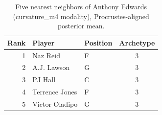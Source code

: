 \begin{table}[htbp]
  \centering\small
  \begin{tabular}{rllc}
    \toprule
    Rank & Player & Position & Archetype \\
    \midrule
    1 & Naz Reid & F & 3 \\
    2 & A.J. Lawson & G & 3 \\
    3 & PJ Hall & C & 3 \\
    4 & Terrence Jones & F & 3 \\
    5 & Victor Oladipo & G & 3 \\
    \bottomrule
  \end{tabular}
  \caption{Five nearest neighbors of Anthony Edwards (curvature_m4 modality), Procrustes-aligned posterior mean.}
  \label{tab:Anthony_Edwards_neighbors_curvature_m4}
\end{table}


